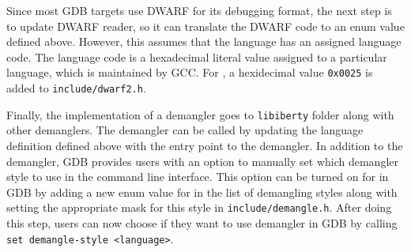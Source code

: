 Since most GDB targets use DWARF for its debugging format, the next step is to
update DWARF reader, so it can translate the DWARF code to an enum value defined
above. However, this assumes that the language has an assigned language code.
The language code is a hexadecimal literal value assigned to a particular
language, which is maintained by GCC. For \CFA, a hexidecimal value
\verb|0x0025| is added to \verb|include/dwarf2.h|.

Finally, the implementation of a demangler goes to \verb|libiberty| folder along with
other demanglers. The demangler can be called by updating the language
definition defined above with the entry point to the \CFAS demangler.
In addition to the demangler, GDB provides users with an option
to manually set which demangler style to use in the command line interface.
This option can be turned on for \CFAS in GDB by adding a new enum value for \CFAS in
the list of demangling styles along with setting the appropriate mask for this
style in \verb|include/demangle.h|. After doing this step, users can now choose
if they want to use \CFAS demangler in GDB by calling \verb|set demangle-style <language>|.
